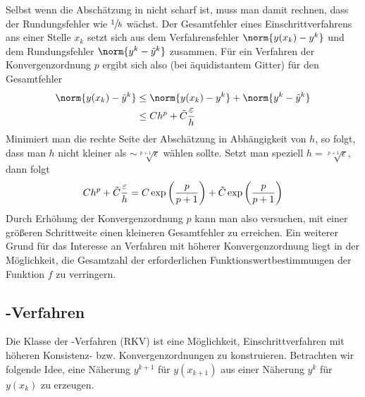Selbst wenn die Abschätzung in  nicht scharf ist, muss man damit rechnen, dass der Rundungsfehler wie $\sfrac{1}{h}$ wächst. Der Gesamtfehler eines Einschrittverfahrens ans einer Stelle $x_k$ setzt sich aus dem Verfahrensfehler $\norm{y(x_k)-y^k}$ und dem Rundungsfehler $\norm{y^k-\tilde{y}^k}$ zusammen. Für ein Verfahren der Konvergenzordnung $p$ ergibt sich also (bei äquidistantem Gitter) für den Gesamtfehler
\begin{align}
	\norm{y(x_k)-\tilde{y}^k} &\le \norm{y(x_k)-y^k} + \norm{y^k-\tilde{y}^k} \notag \\
	&\le Ch^p + \tilde{C}\frac{\epsilon}{h} \notag
\end{align}
Minimiert man die rechte Seite der Abschätzung in Abhängigkeit von $h$, so folgt, dass man $h$ nicht kleiner als
$\sim \sqrt[p+1]{\epsilon}$ wählen sollte. Setzt man speziell $h=\sqrt[p+1]{\epsilon}$, dann folgt
\begin{align}
	Ch^p + \tilde{C}\frac{\epsilon}{h} = C\exp\left(\frac{p}{p+1}\right) + \tilde{C}\exp\left(\frac{p}{p+1}\right) \notag
\end{align}
Durch Erhöhung der Konvergenzordnung $p$ kann man also versuchen, mit einer größeren Schrittweite einen kleineren Gesamtfehler zu erreichen. Ein weiterer Grund für das Interesse an Verfahren mit höherer Konvergenzordnung liegt in der Möglichkeit, die Gesamtzahl der erforderlichen Funktionswertbestimmungen der Funktion $f$ zu verringern.

\subsection{-Verfahren}

Die Klasse der -Verfahren (RKV) ist eine Möglichkeit, Einschrittverfahren mit höheren Konsistenz- bzw. Konvergenzordnungen zu konstruieren. Betrachten wir folgende Idee, eine Näherung $y^{k+1}$ für $y(x_{k+1})$ aus einer Näherung $y^k$ für $y(x_k)$ zu erzeugen. 

